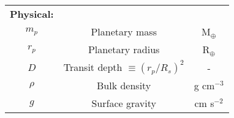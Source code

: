 \begin{table*}
\begin{tabular}{ccc}
  \textbf{Physical:} & & \\
  $m_p$ & Planetary mass & M$_{\oplus}$ \\
  $r_p$ & Planetary radius & R$_{\oplus}$ \\
  $D$ & Transit depth $\equiv (r_p/R_s)^2$ & - \\
  $\rho$ & Bulk density & g cm$^{-3}$ \\
  $g$ & Surface gravity & cm s$^{-2}$ \\
  \end{tabular}
\end{table*}

